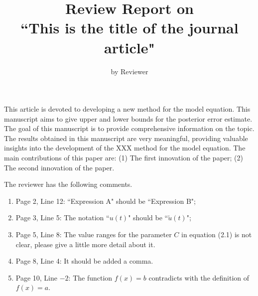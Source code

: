 \documentclass{article}
\title{Review Report on \\
``This is the title of the journal article"
}
\author{by Reviewer}
\date{}
\begin{document}
\maketitle

This article is devoted to developing a new method for the model equation.
This manuscript aims to give upper and lower bounds for the posterior error estimate.
The goal of this manuscript is to provide comprehensive information on the topic.
The results obtained in this manuscript are very meaningful, providing valuable insights into the development of the XXX method for the model equation.
The main contributions of this paper are: (1) The first innovation of the paper; (2) The second innovation of the paper.

The reviewer has the following comments.

\begin{enumerate}[label={\arabic*.}]
\item Page 2, Line 12: ``Expression A" should be ``Expression B";
\item Page 3, Line 5: The notation ``$u(t)$" should be ``$\tilde{u}(t)$";
\item Page 5, Line 8: The value ranges for the parameter $C$ in equation (2.1) is not clear, please give a little more detail about it.
\item Page 8, Line 4: It should be added a comma.
\item Page 10, Line $-2$:  The function $f(x)=b$ contradicts with the definition of $f(x)=a$.
\end{enumerate}
\end{document}
